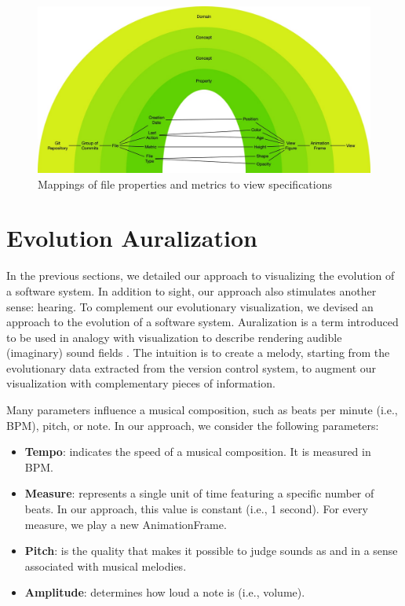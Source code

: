 \begin{figure}
    \center
    \includegraphics[width=\textwidth]{ApproachMapping.jpg}
    \caption{Mappings of file properties and metrics to view specifications}
    \label{fig:ApproachMapping}
\end{figure}


\newpage
\section{Evolution Auralization}
\label{sec:audioApproach}
In the previous sections, we detailed our approach to visualizing the evolution of a software system. In addition to sight, our approach also stimulates another sense: hearing. To complement our evolutionary visualization, we devised an approach to \emph{} the evolution of a software system. Auralization is a term introduced to be used in analogy with visualization to describe rendering audible (imaginary) sound fields \cite{kleiner1993}. The intuition is to create a melody, starting from the evolutionary data extracted from the version control system, to augment our visualization with complementary pieces of information.


Many parameters influence a musical composition, such as beats per minute (i.e., BPM), pitch, or note. In our approach, we consider the following parameters:

\begin{itemize}
    \item \textbf{Tempo}: indicates the speed of a musical composition. It is measured in BPM. 
    \item \textbf{Measure}: represents a single unit of time featuring a specific number of beats. In our approach, this value is constant (i.e., 1 second). For every measure, we play a new AnimationFrame.
	\item \textbf{Pitch}: is the quality that makes it possible to judge sounds as  and  in a sense associated with musical melodies.
	\item \textbf{Amplitude}: determines how loud a note is (i.e., volume).
\end{itemize}

